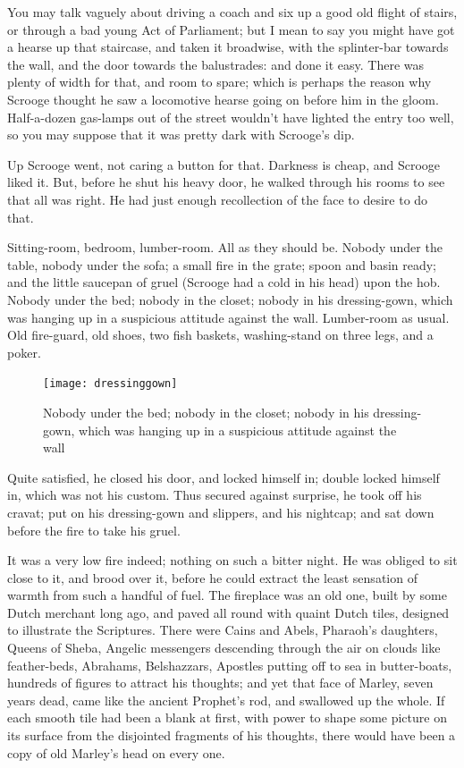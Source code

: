 You may talk vaguely about driving a coach and six up a good old flight of stairs, or through a bad young Act of Parliament; but I mean to say you might have got a hearse up that staircase, and taken it broad\-wise, with the splinter-bar towards the wall, and the door towards the balustrades: and done it easy. There was plenty of width for that, and room to spare; which is perhaps the reason why Scrooge thought he saw a locomotive hearse going on before him in the gloom. Half-a-dozen gas-lamps out of the street wouldn't have lighted the entry too well, so you may suppose that it was pretty dark with Scrooge's dip.

Up Scrooge went, not caring a button for that. Darkness is cheap, and Scrooge liked it. But, before he shut his heavy door, he walked through his rooms to see that all was right. He had just enough recollection of the face to desire to do that.

Sitting-room, bedroom, lumber-room. All as they should be. Nobody under the table, nobody under the sofa; a small fire in the grate; spoon and basin ready; and the little saucepan of gruel (Scrooge had a cold in his head) upon the hob. Nobody under the bed; nobody in the closet; nobody in his dressing-gown, which was hanging up in a suspicious attitude against the wall. Lumber-room as usual. Old fire-guard, old shoes, two fish baskets, washing-stand on three legs, and a poker.

\begin{figure}[p]
\begin{minipage}[c]{\textwidth}
\texttt{[image: dressinggown]}
\caption[\textbf{Nobody in his dressing-gown}]{Nobody under the bed; nobody in the closet; nobody in his dressing-gown, which was hanging up in a suspicious attitude against the wall}
\end{minipage}
\end{figure}

 
Quite satisfied, he closed his door, and locked himself in; double locked himself in, which was not his custom. Thus secured against surprise, he took off his cravat; put on his dressing-gown and slippers, and his nightcap; and sat down before the fire to take his gruel.

It was a very low fire indeed; nothing on such a bitter night. He was obliged to sit close to it, and brood over it, before he could extract the least sensation of warmth from such a handful of fuel. The fireplace was an old one, built by some Dutch merchant long ago, and paved all round with quaint Dutch tiles, designed to illustrate the Scriptures. There were Cains and Abels, Pharaoh's daughters, Queens of Sheba, Angelic messengers descending  through the air on clouds like feather-beds, Abrahams, Belshazzars, Apostles putting off to sea in butter-boats, hundreds of figures to attract his thoughts; and yet that face of Marley, seven years dead, came like the ancient Prophet's rod, and swallowed up the whole. If each smooth tile had been a blank at first, with power to shape some picture on its surface from the disjointed fragments of his thoughts, there would have been a copy of old Marley's head on every one.

